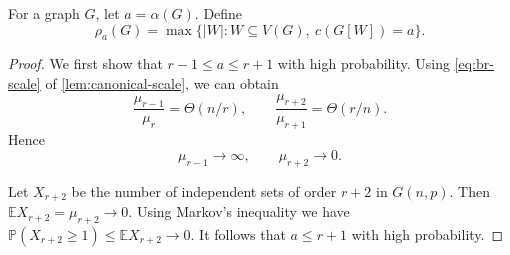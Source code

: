 \documentclass[11pt,reqno]{amsart}
\newtheorem{lemma}[theorem]{Lemma}
\theoremstyle{definition}
\theoremstyle{remark}
\newcommand{\EE}{\mathbb E}
\begin{document}
For a graph $G$, let $a=\alpha(G)$. Define 
\begin{equation}\label{eq:rho-definition}
 \rho_a(G)=\max\{|W|:W\subseteq V(G),\ c(G[W])=a\}.
\end{equation}


\begin{proof} We first show that  $r-1\leq a\leq r+1$ with high probability. 
Using \eqref{eq:br-scale} of \cref{lem:canonical-scale}, we can obtain
\begin{equation}\label{eq:neighboring-means}
 \frac{\mu_{r-1}}{\mu_r}=\Theta(n/r),\qquad
 \frac{\mu_{r+2}}{\mu_{r+1}}=\Theta(r/n).
\end{equation}
Hence
\begin{equation}\label{eq:neighboring-consequences}
 \mu_{r-1}\to\infty,\qquad \mu_{r+2}\to0.
\end{equation}

Let $X_{r+2}$ be the number of  independent sets of order $r+2$ in $G(n,p)$. Then 
$\EE X_{r+2}=\mu_{r+2}\to0$. Using Markov's inequality we have 
$\mathbb{P} (X_{r+2}\geq1)\leq\EE X_{r+2}\rightarrow0$. It follows that $a\leq r+1$ with high probability.



\end{proof}
\end{document}
